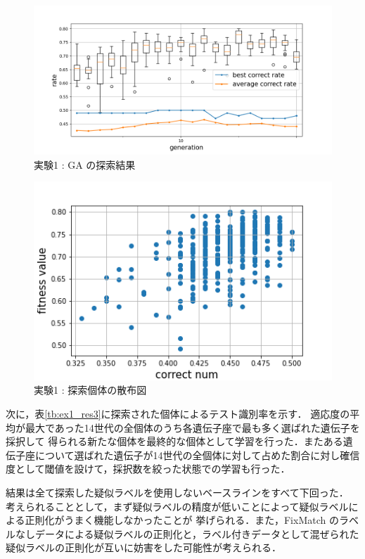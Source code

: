 \begin{figure}[h]
	\begin{center}
		\includegraphics[scale=0.65]{./images/ex1_res_graph.png}
		\caption{実験1 : GA の探索結果\label{fig:ex1_res1}}
	\end{center}
\end{figure}

\begin{figure}[h]
	\begin{center}
		\includegraphics[scale=1.0]{./images/ex1_res_img.png}
		\caption{実験1 : 探索個体の散布図\label{fig:ex1_res2}}
	\end{center}
\end{figure}
\clearpage

次に，表\ref{tb:ex1_res3}に探索された個体によるテスト識別率を示す．
適応度の平均が最大であった14世代の全個体のうち各遺伝子座で最も多く選ばれた遺伝子を採択して
得られる新たな個体を最終的な個体として学習を行った．またある遺伝子座について選ばれた遺伝子が14世代の全個体に対して占めた割合に対し確信度として閾値を設けて，採択数を絞った状態での学習も行った．

結果は全て探索した疑似ラベルを使用しないベースラインをすべて下回った．
考えられることとして，まず疑似ラベルの精度が低いことによって疑似ラベルによる正則化がうまく機能しなかったことが
挙げられる．また，FixMatch のラベルなしデータによる疑似ラベルの正則化と，ラベル付きデータとして混ぜられた疑似ラベルの正則化が互いに妨害をした可能性が考えられる．

